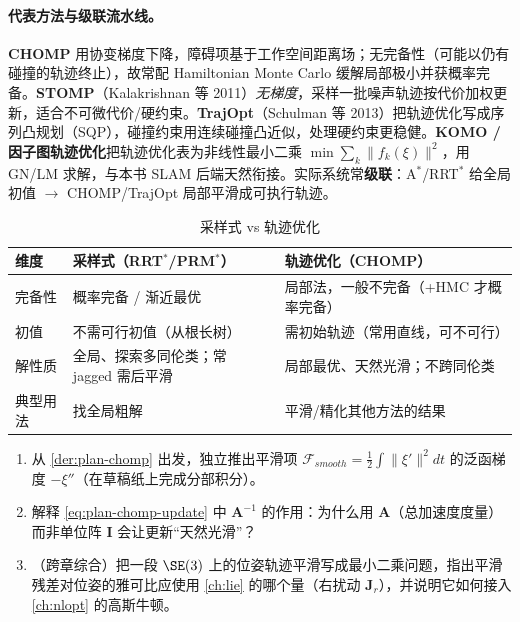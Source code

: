 \paragraph{代表方法与级联流水线。}\rebuilt
\textbf{CHOMP} 用协变梯度下降，障碍项基于工作空间距离场；无完备性（可能以仍有碰撞的轨迹终止），故常配 Hamiltonian Monte Carlo 缓解局部极小并获概率完备。\textbf{STOMP}（Kalakrishnan 等 2011）\emph{无梯度}，采样一批噪声轨迹按代价加权更新，适合不可微代价/硬约束。\textbf{TrajOpt}（Schulman 等 2013）把轨迹优化写成序列凸规划（SQP），碰撞约束用连续碰撞凸近似，处理硬约束更稳健。\textbf{KOMO / 因子图轨迹优化}把轨迹优化表为非线性最小二乘 $\min\sum_k\|f_k(\xi)\|^2$，用 GN/LM 求解，与本书 SLAM 后端天然衔接。实际系统常\textbf{级联}：A$^*$/RRT$^*$ 给全局初值 $\to$ CHOMP/TrajOpt 局部平滑成可执行轨迹。

\begin{table}[H]\centering\small
\caption{采样式 vs 轨迹优化}
\label{tab:plan-traj-cmp}
\begin{tabular}{lll}
\toprule
维度 & 采样式（RRT$^*$/PRM$^*$） & 轨迹优化（CHOMP） \\
\midrule
完备性 & 概率完备 / 渐近最优 & 局部法，一般不完备（+HMC 才概率完备） \\
初值 & 不需可行初值（从根长树） & 需初始轨迹（常用直线，可不可行） \\
解性质 & 全局、探索多同伦类；常 jagged 需后平滑 & 局部最优、天然光滑；不跨同伦类 \\
典型用法 & 找全局粗解 & 平滑/精化其他方法的结果 \\
\bottomrule
\end{tabular}
\end{table}

\begin{practice}
\begin{enumerate}
  \item 从 \cref{der:plan-chomp} 出发，独立推出平滑项 $\mathcal{F}_{smooth}=\tfrac12\int\|\xi'\|^2dt$ 的泛函梯度 $-\xi''$（在草稿纸上完成分部积分）。
  \item 解释 \cref{eq:plan-chomp-update} 中 $\mathbf{A}^{-1}$ 的作用：为什么用 $\mathbf{A}$（总加速度度量）而非单位阵 $\mathbf{I}$ 会让更新“天然光滑”？
  \item （跨章综合）把一段 $\SE(3)$ 上的位姿轨迹平滑写成最小二乘问题，指出平滑残差对位姿的雅可比应使用 \cref{ch:lie} 的哪个量（右扰动 $\mathbf{J}_r$），并说明它如何接入 \cref{ch:nlopt} 的高斯牛顿。
\end{enumerate}
\end{practice}

